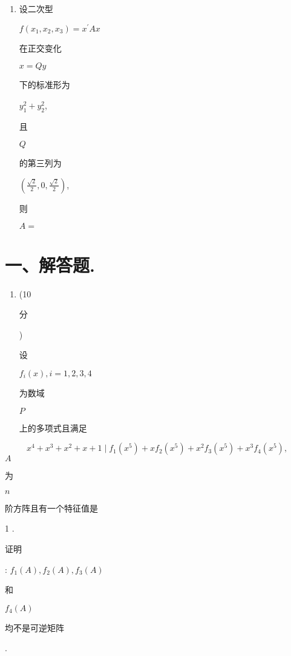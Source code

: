 \documentclass[10pt]{article}
\begin{document}
\begin{enumerate}
  \item \begin{CJK}{UTF8}{mj}设二次型\end{CJK} $f\left(x_{1}, x_{2}, x_{3}\right)=x^{\prime} A x$ \begin{CJK}{UTF8}{mj}在正交变化\end{CJK} $x=Q y$ \begin{CJK}{UTF8}{mj}下的标准形为\end{CJK} $y_{1}^{2}+y_{2}^{2}$, \begin{CJK}{UTF8}{mj}且\end{CJK} $Q$ \begin{CJK}{UTF8}{mj}的第三列为\end{CJK} $\left(\frac{\sqrt{2}}{2}, 0, \frac{\sqrt{2}}{2}\right)$, \begin{CJK}{UTF8}{mj}则\end{CJK} $A=$

\end{enumerate}
\section{一、解答题.}
\begin{enumerate}
  \item (10 \begin{CJK}{UTF8}{mj}分\end{CJK}) \begin{CJK}{UTF8}{mj}设\end{CJK} $f_{i}(x), i=1,2,3,4$ \begin{CJK}{UTF8}{mj}为数域\end{CJK} $P$ \begin{CJK}{UTF8}{mj}上的多项式且满足\end{CJK}
\end{enumerate}
$$
x^{4}+x^{3}+x^{2}+x+1 \mid f_{1}\left(x^{5}\right)+x f_{2}\left(x^{5}\right)+x^{2} f_{3}\left(x^{5}\right)+x^{3} f_{4}\left(x^{5}\right),
$$
$A$ \begin{CJK}{UTF8}{mj}为\end{CJK} $n$ \begin{CJK}{UTF8}{mj}阶方阵且有一个特征值是\end{CJK} 1 . \begin{CJK}{UTF8}{mj}证明\end{CJK}: $f_{1}(A), f_{2}(A), f_{3}(A)$ \begin{CJK}{UTF8}{mj}和\end{CJK} $f_{4}(A)$ \begin{CJK}{UTF8}{mj}均不是可逆矩阵\end{CJK}.
\end{document}
